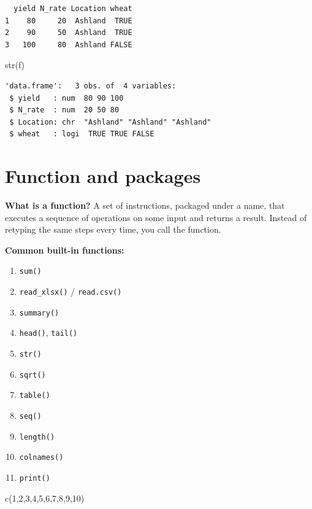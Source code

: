 \documentclass[
  letterpaper,
  DIV=11,
  numbers=noendperiod]{scrartcl}
\newenvironment{Shaded}{\begin{snugshade}}{\end{snugshade}}
\newcommand{\DecValTok}[1]{\textcolor[rgb]{0.68,0.00,0.00}{#1}}
\newcommand{\FunctionTok}[1]{\textcolor[rgb]{0.28,0.35,0.67}{#1}}
\newcommand{\NormalTok}[1]{\textcolor[rgb]{0.00,0.23,0.31}{#1}}
\providecommand{\tightlist}{%
  \setlength{\itemsep}{0pt}\setlength{\parskip}{0pt}}
\begin{document}
\begin{verbatim}
  yield N_rate Location wheat
1    80     20  Ashland  TRUE
2    90     50  Ashland  TRUE
3   100     80  Ashland FALSE
\end{verbatim}

\begin{Shaded}
\begin{Highlighting}[]
\FunctionTok{str}\NormalTok{(f)}
\end{Highlighting}
\end{Shaded}

\begin{verbatim}
'data.frame':   3 obs. of  4 variables:
 $ yield   : num  80 90 100
 $ N_rate  : num  20 50 80
 $ Location: chr  "Ashland" "Ashland" "Ashland"
 $ wheat   : logi  TRUE TRUE FALSE
\end{verbatim}

\section{Function and packages}\label{function-and-packages}

\textbf{What is a function?} A set of instructions, packaged under a
name, that executes a sequence of operations on some input and returns a
result. Instead of retyping the same steps every time, you call the
function.

\textbf{Common built-in functions:}

\begin{enumerate}
\def\labelenumi{\arabic{enumi}.}
\tightlist
\item
  \texttt{sum()}
\item
  \texttt{read\_xlsx()} / \texttt{read.csv()}
\item
  \texttt{summary()}
\item
  \texttt{head()}, \texttt{tail()}
\item
  \texttt{str()}
\item
  \texttt{sqrt()}
\item
  \texttt{table()}
\item
  \texttt{seq()}
\item
  \texttt{length()}
\item
  \texttt{colnames()}
\item
  \texttt{print()}
\end{enumerate}

\begin{Shaded}
\begin{Highlighting}[]
\FunctionTok{c}\NormalTok{(}\DecValTok{1}\NormalTok{,}\DecValTok{2}\NormalTok{,}\DecValTok{3}\NormalTok{,}\DecValTok{4}\NormalTok{,}\DecValTok{5}\NormalTok{,}\DecValTok{6}\NormalTok{,}\DecValTok{7}\NormalTok{,}\DecValTok{8}\NormalTok{,}\DecValTok{9}\NormalTok{,}\DecValTok{10}\NormalTok{)}
\end{Highlighting}
\end{Shaded}
\end{document}
